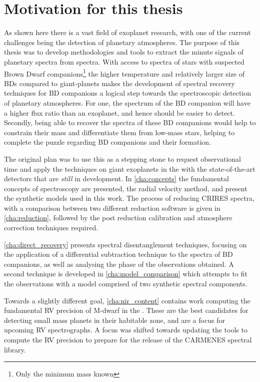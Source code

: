 \section{Motivation for this thesis}
\label{sec:thesis_motivation}

As shown here there is a vast field of exoplanet research, with one of the current challenges being the detection of planetary atmospheres.
The purpose of this thesis was to develop methodologies and tools to extract the minute signals of planetary spectra from \nir{} spectra.
With access to \nir{} spectra of stars with suspected Brown Dwarf companions\footnote{Only the minimum mass \mtwosini known} the higher temperature and relatively larger size of BDs compared to giant-planets makes the development of spectral recovery techniques for BD companions a logical step towards the spectroscopic detection of planetary atmospheres.
For one, the spectrum of the BD companion will have a higher flux ratio than an exoplanet, and hence should be easier to detect.
Secondly, being able to recover the spectra of these BD companions would help to constrain their mass and differentiate them from low-mass stars, helping to complete the puzzle regarding BD companions and their formation.

The original plan was to use this as a stepping stone to request observational time and apply the techniques on giant exoplanets in the \nir{} with the state-of-the-art detectors that are \emph{still} in development.
In \cref{cha:concepts} the fundamental concepts of \nir{} spectroscopy are presented, the radial velocity method, and present the synthetic models used in this work.
The process of reducing \nir{} CRIRES spectra, with a comparison between two different reduction software is given in \cref{cha:reduction}, followed by the post reduction calibration and atmosphere correction techniques required.

\cref{cha:direct_recovery} presents spectral disentanglement techniques, focusing on the application of a differential subtraction technique to the \nir{} spectra of BD companions, as well as analysing the phase of the observations obtained.
A second technique is developed in \cref{cha:model_comparison} which attempts to fit the observations with a model comprised of two synthetic spectral components.

Towards a slightly different goal, \cref{cha:nir_content} contains work computing the fundamental RV precision of {M-dwarf} in the \nir{}.
These are the best candidates for detecting small mass planets in their habitable zone, and are a focus for upcoming \nir{} RV spectrographs.
A focus was shifted towards updating the tools to compute the RV precision to prepare for the release of the CARMENES \nir{} spectral library.
